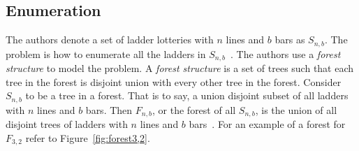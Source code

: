 \subsection{Enumeration}
The authors denote a set of ladder lotteries with $n$ lines and 
$b$ bars as $S_{n,b}$. The problem is how to enumerate all the 
ladders in $S_{n,b}$~\cite{A6}. The authors use a \emph{forest structure}
to model the problem. A \emph{forest structure} is a set of trees 
such that each tree in the forest is disjoint union with every other 
tree in the forest. Consider $S_{n,b}$ to be a tree in a forest.
That is to say, a union disjoint subset of all ladders with $n$
lines and $b$ bars. Then $F_{n,b}$, or the forest of all $S_{n,b}$,
is the union of all disjoint trees of ladders with $n$ lines and $b$ bars~\cite{A6}. For an example 
of a forest for $F_{3,2}$ refer to Figure~\ref{fig:forest3,2}.\par %
